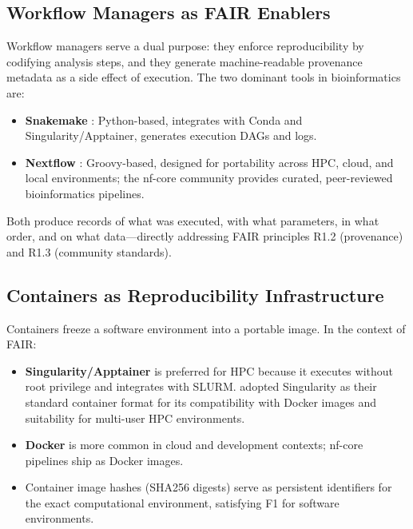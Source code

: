 \subsection{Workflow Managers as FAIR Enablers}

Workflow managers serve a dual purpose: they enforce reproducibility by codifying analysis steps, and they generate machine-readable provenance metadata as a side effect of execution. The two dominant tools in bioinformatics are:

\begin{itemize}
\item \textbf{Snakemake} \parencite{molder2021}: Python-based, integrates with Conda and Singularity/Apptainer, generates execution DAGs and logs.

\item \textbf{Nextflow} \parencite{di2017}: Groovy-based, designed for portability across HPC, cloud, and local environments; the nf-core community \parencite{ewels2020} provides curated, peer-reviewed bioinformatics pipelines.
\end{itemize}

Both produce records of what was executed, with what parameters, in what order, and on what data---directly addressing FAIR principles R1.2 (provenance) and R1.3 (community standards).

\subsection{Containers as Reproducibility Infrastructure}

Containers freeze a software environment into a portable image. In the context of FAIR:

\begin{itemize}
\item \textbf{Singularity/Apptainer} is preferred for HPC because it executes without root privilege and integrates with SLURM. \textcite{zafeiropoulos2021} adopted Singularity as their standard container format for its compatibility with Docker images and suitability for multi-user HPC environments.

\item \textbf{Docker} is more common in cloud and development contexts; nf-core pipelines ship as Docker images.

\item Container image hashes (SHA256 digests) serve as persistent identifiers for the exact computational environment, satisfying F1 for software environments.
\end{itemize}

